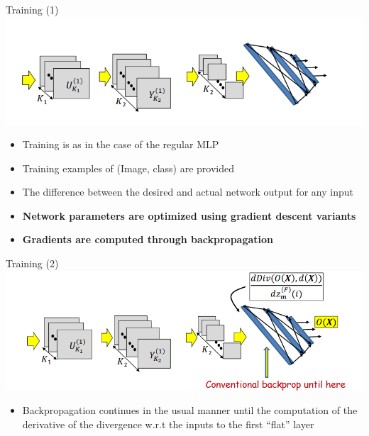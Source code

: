\documentclass[default, aspectratio=169]{beamer}
\begin{document}
	\begin{frame}{Training (1)}
		\centering
		\includegraphics[keepaspectratio, scale=0.6]{pic/training.png}
		\smallskip
		\begin{itemize}
			\item Training is as in the case of the regular MLP
			\item Training examples of (Image, class) are provided
			\item The difference between the desired and actual network output for any input
			\item \textbf{Network parameters are optimized using gradient descent variants}
			\item \textbf{Gradients are computed through backpropagation}
		\end{itemize}
	\end{frame}
	\begin{frame}{Training (2)}
		\centering
		\includegraphics[keepaspectratio, scale=0.6]{pic/training1.png}
		\smallskip
		\begin{itemize}
			\item Backpropagation continues in the usual manner until the computation of the derivative of the divergence w.r.t the inputs to the first ``flat'' layer
		\end{itemize}
		
	\end{frame}
\end{document}
